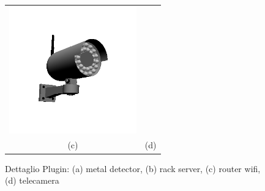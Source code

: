 \begin{figure}[htbp]
\begin{center}
\begin{tabular}{c @{\hspace{1em}} c}
\includegraphics[width=5.5cm]{images/telecamera} \\
 (c) & (d) \\
\end{tabular}
\end{center}
\caption{Dettaglio Plugin: (a) metal detector, (b) rack server, (c) router wifi, (d) telecamera}\label{fig:figura7}
\end{figure}
